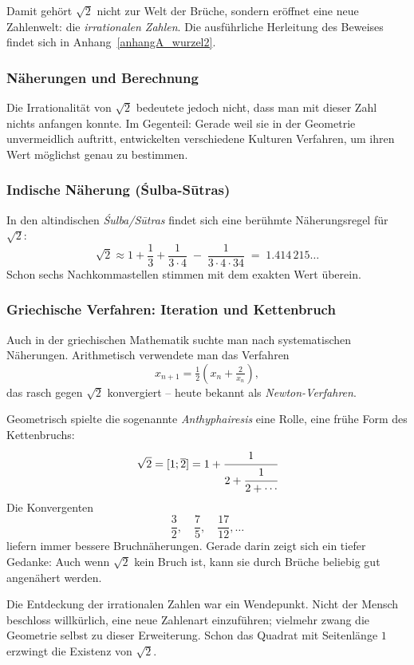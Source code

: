 Damit gehört $\sqrt{2}$ nicht zur Welt der Brüche,
sondern eröffnet eine neue Zahlenwelt:
die \emph{irrationalen Zahlen}.
Die ausführliche Herleitung des Beweises findet sich in
Anhang~\ref{anhangA_wurzel2}.


\subsubsection*{Näherungen und Berechnung}
Die Irrationalität von $\sqrt{2}$ bedeutete jedoch nicht,
dass man mit dieser Zahl nichts anfangen konnte.
Im Gegenteil:
Gerade weil sie in der Geometrie unvermeidlich auftritt,
entwickelten verschiedene Kulturen Verfahren,
um ihren Wert möglichst genau zu bestimmen.

\subsubsection*{Indische Näherung (Śulba-Sūtras)}
In den altindischen \emph{Śulba\-/Sūtras}
findet sich eine berühmte Näherungsregel für $\sqrt{2}$:
\[
\sqrt{2}\approx 1+\frac{1}{3}+\frac{1}{3\cdot 4}\;-\;\frac{1}{3\cdot 4\cdot 34}
\;=\;1.414\,215\ldots
\]
Schon sechs Nachkommastellen stimmen mit dem exakten Wert überein.

\subsubsection*{Griechische Verfahren: Iteration und Kettenbruch}
Auch in der griechischen Mathematik suchte man nach systematischen Näherungen.
Arithmetisch verwendete man das Verfahren
\[
x_{n+1}=\tfrac{1}{2}\left(x_n+\tfrac{2}{x_n}\right),
\]
das rasch gegen $\sqrt{2}$ konvergiert --
heute bekannt als \emph{Newton-Verfahren}.

Geometrisch spielte die sogenannte \emph{Anthyphairesis} eine Rolle,
eine frühe Form des Kettenbruchs:
\[
\sqrt{2}=[1;\overline{2}]
=1+\cfrac{1}{2+\cfrac{1}{2+\cdots}}
\]
Die Konvergenten
\[
\frac{3}{2},\quad \frac{7}{5},\quad \frac{17}{12},\dots
\]
liefern immer bessere Bruchnäherungen.
Gerade darin zeigt sich ein tiefer Gedanke:
Auch wenn $\sqrt{2}$ kein Bruch ist,
kann sie durch Brüche beliebig gut angenähert werden.

\begin{NoteBox}
		\label{box:mathentdeckung}
	Die Entdeckung der irrationalen Zahlen war ein Wendepunkt.
	Nicht der Mensch beschloss willkürlich,
	eine neue Zahlenart einzuführen;
	vielmehr zwang die Geometrie selbst zu dieser Erweiterung.
	Schon das Quadrat mit Seitenlänge $1$
	erzwingt die Existenz von $\sqrt{2}$.
	\label{box:mathentdeckung}
\end{NoteBox}

